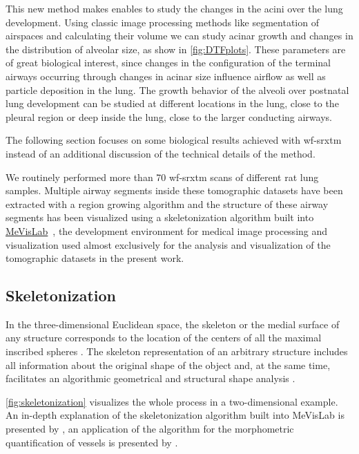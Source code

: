 This new method makes enables to study the changes in the acini over the lung development. Using classic image processing methods like segmentation of airspaces and calculating their volume we can study acinar growth and changes in the distribution of alveolar size, as show in \autoref{fig:DTFplots}. These parameters are of great biological interest, since changes in the configuration of the terminal airways occurring through changes in acinar size influence airflow as well as particle deposition in the lung. The growth behavior of the alveoli over postnatal lung development can be studied at different locations in the lung, \eg close to the pleural region or deep inside the lung, close to the larger conducting airways.

The following section focuses on some biological results achieved with \ac{wf-srxtm} instead of an additional discussion of the technical details of the method.

We routinely performed more than 70 \ac{wf-srxtm} scans of different rat lung samples. Multiple airway segments inside these tomographic datasets have been extracted with a region growing algorithm \cite{wiki:regiongrowing,Zucker1976} and the structure of these airway segments has been visualized using a skeletonization algorithm built into \href{http://mevislab.de/}{MeVisLab}~\cite{Bitter2007}, the development environment for medical image processing and visualization used almost exclusively for the analysis and visualization of the tomographic datasets in the present work.

\subsection{Skeletonization}
In the three-dimensional Euclidean space, the skeleton or the medial surface of any structure corresponds to the location of the centers of all the maximal inscribed spheres \cite{Blum1967}. The skeleton representation of an arbitrary structure includes all information about the original shape of the object and, at the same time, facilitates an algorithmic geometrical and structural shape analysis \cite{Selle2002}. 

\autoref{fig:skeletonization} visualizes the whole process in a two-dimensional example. An in-depth explanation of the skeletonization algorithm built into MeVisLab is presented by \citet{Selle2002}, an application of the algorithm for the morphometric quantification of vessels is presented by \citet{Boskamp2004}.

